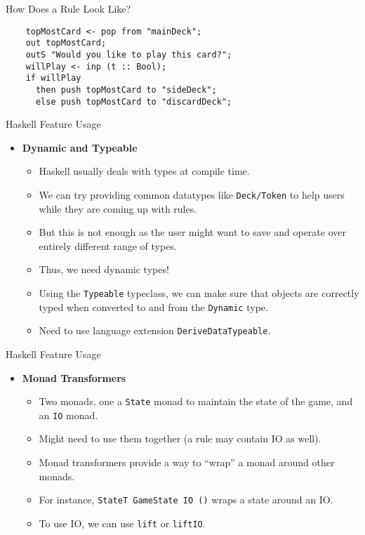 \documentclass[pdf]{beamer}
\begin{document}
\begin{frame}[fragile]{How Does a Rule Look Like?}
  \begin{lstlisting}
    topMostCard <- pop from "mainDeck";
    out topMostCard;
    outS "Would you like to play this card?";
    willPlay <- inp (t :: Bool);
    if willPlay
      then push topMostCard to "sideDeck";
      else push topMostCard to "discardDeck";
  \end{lstlisting}
\end{frame}

\begin{frame}{Haskell Feature Usage}
  \begin{itemize}
  \item <1-> \textbf{Dynamic and Typeable}
    \begin{itemize}
    \item <2-> Haskell usually deals with types at compile time.
    \item <3-> We can try providing common datatypes like \texttt{Deck/Token} to help users while they are coming up with rules.
    \item <4-> But this is not enough as the user might want to save and operate over entirely different range of types.
    \item <5-> Thus, we need dynamic types!
    \item <6-> Using the \texttt{Typeable} typeclass, we can make sure that objects are correctly typed when converted to and from the \texttt{Dynamic} type.
      \item <7-> Need to use language extension \texttt{DeriveDataTypeable}.
    \end{itemize}
  \end{itemize}
\end{frame}

\begin{frame}{Haskell Feature Usage}
  \begin{itemize}
  \item <1-> \textbf{Monad Transformers}
    \begin{itemize}
    \item <2-> Two monads, one a \texttt{State} monad to maintain the state of the game, and an \texttt{IO} monad.
    \item <3-> Might need to use them together (a rule may contain IO as well).
    \item <4-> Monad transformers provide a way to ``wrap'' a monad around other monads.
    \item <5-> For instance, \texttt{StateT GameState IO ()} wraps a state around an IO.
    \item <6-> To use IO, we can use \texttt{lift} or \texttt{liftIO}.
    \end{itemize}
  \end{itemize}
\end{frame}
\end{document}

